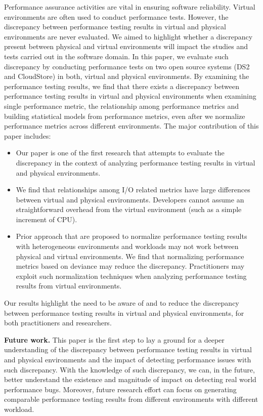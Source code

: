 \documentclass[smallextended]{svjour3}       %
\begin{document}
Performance assurance activities are vital in ensuring software reliability. Virtual environments are often used to conduct performance tests. However, the discrepancy between performance testing results in virtual and physical environments are never evaluated. We aimed to highlight whether a discrepancy present between physical and virtual environments will impact the studies and tests carried out in the software domain. In this paper, we evaluate such discrepancy by conducting performance tests on two open source systems (DS2 and CloudStore) in both, virtual and physical environments. By examining the performance testing results, we find that there exists a discrepancy between performance testing results in virtual and physical environments when examining single performance metric, the relationship among performance metrics and building statistical models from performance metrics, even after we normalize performance metrics across different environments. The major contribution of this paper includes: 
\begin{itemize} 
	\item Our paper is one of the first research that attempts to evaluate the discrepancy in the context of analyzing performance testing results in virtual and physical environments.
	\item We find that relationships among I/O related metrics have large differences between virtual and physical environments. Developers cannot assume an straightforward overhead from the virtual environment (such as a simple increment of CPU).
	\item Prior approach that are proposed to normalize performance testing results with heterogeneous environments and workloads may not work between physical and virtual environments. We find that normalizing performance metrics based on deviance may reduce the discrepancy. Practitioners may exploit such normalization techniques when analyzing performance testing results from virtual environments.
\end{itemize}

Our results highlight the need to be aware of and to reduce the discrepancy between performance testing results in virtual and physical environments, for both practitioners and researchers. 

\noindent \textbf{Future work.} This paper is the first step to lay a ground for a deeper understanding of the discrepancy between performance testing results in virtual and physical environments and the impact of detecting performance issues with such discrepancy. With the knowledge of such discrepancy, we can, in the future, better understand the existence and magnitude of impact on detecting real world performance bugs. Moreover, future research effort can focus on generating comparable performance testing results from different environments with different workload. 
\end{document}
